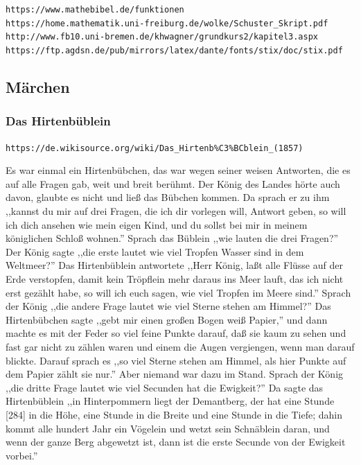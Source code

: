 \documentclass[10pt,a4paper]{article}
\begin{document}
\verb+https://www.mathebibel.de/funktionen+ \\
\verb+https://home.mathematik.uni-freiburg.de/wolke/Schuster_Skript.pdf+ \\
\verb+http://www.fb10.uni-bremen.de/khwagner/grundkurs2/kapitel3.aspx+ \\
\verb+https://ftp.agdsn.de/pub/mirrors/latex/dante/fonts/stix/doc/stix.pdf+


\newpage
\subsection{Märchen}

\subsubsection{Das Hirtenbüblein}

\verb+https://de.wikisource.org/wiki/Das_Hirtenb%C3%BCblein_(1857)+

\vskip 4pt
Es war einmal ein Hirtenbübchen, das war wegen seiner weisen Antworten, die es
auf alle Fragen gab, weit und breit berühmt. Der König des Landes hörte auch
davon, glaubte es nicht und ließ das Bübchen kommen. Da sprach er zu ihm
,,kannst du mir auf drei Fragen, die ich dir vorlegen will, Antwort geben, so
will ich dich ansehen wie mein eigen Kind, und du sollst bei mir in meinem
königlichen Schloß wohnen.'' Sprach das Büblein ,,wie lauten die drei Fragen?''
Der König sagte ,,die erste lautet wie viel Tropfen Wasser sind in dem
Weltmeer?'' Das Hirtenbüblein antwortete ,,Herr König, laßt alle Flüsse auf der
Erde verstopfen, damit kein Tröpflein mehr daraus ins Meer lauft, das ich nicht
erst gezählt habe, so will ich euch sagen, wie viel Tropfen im Meere sind.''
Sprach der König ,,die andere Frage lautet wie viel Sterne stehen am Himmel?''
Das Hirtenbübchen sagte ,,gebt mir einen großen Bogen weiß Papier,'' und dann
machte es mit der Feder so viel feine Punkte darauf, daß sie kaum zu sehen und
fast gar nicht zu zählen waren und einem die Augen vergiengen, wenn man darauf
blickte. Darauf sprach es ,,so viel Sterne stehen am Himmel, als hier Punkte auf
dem Papier zählt sie nur.'' Aber niemand war dazu im Stand. Sprach der König
,,die dritte Frage lautet wie viel Secunden hat die Ewigkeit?'' Da sagte das
Hirtenbüblein ,,in Hinterpommern liegt der Demantberg, der hat eine Stunde [284]
in die Höhe, eine Stunde in die Breite und eine Stunde in die Tiefe; dahin kommt
alle hundert Jahr ein Vögelein und wetzt sein Schnäblein daran, und wenn der
ganze Berg abgewetzt ist, dann ist die erste Secunde von der Ewigkeit vorbei.''
\end{document}
